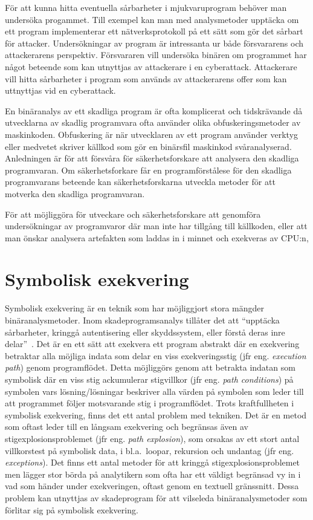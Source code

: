 För att kunna hitta eventuella sårbarheter i mjukvaruprogram behöver man undersöka progammet.
Till exempel kan man med analysmetoder upptäcka om ett program implementerar ett nätverksprotokoll på ett sätt som gör det sårbart för attacker.
Undersökningar av program är intressanta ur både försvararens och attackerarens perspektiv.
Försvararen vill undersöka binären om programmet har något beteende som kan utnyttjas av attackerare i en cyberattack.
Attackerare vill hitta sårbarheter i program som används av attackerarens offer som kan uttnyttjas vid en cyberattack.

En binäranalys av ett skadliga program är ofta komplicerat och tidskrävande då utvecklarna av skadlig programvara ofta använder olika obfuskeringsmetoder av maskinkoden.
Obfuskering är när utvecklaren av ett program använder verktyg eller medvetet skriver källkod som gör en binärsfil maskinkod svåranalyserad.
Anledningen är för att försvåra för säkerhetsforskare att analysera den skadliga programvaran.
Om säkerhetsforkare får en programförstålese för den skadliga programvarans beteende kan säkerhetsforskarna utveckla metoder för att motverka den skadliga programvaran.

För att möjliggöra för utveckare och säkerhetsforskare att genomföra undersökningar av programvaror där man inte har tillgång till källkoden, eller att man önskar analysera artefakten som laddas in i minnet och exekveras av CPU:n,

\section{Symbolisk exekvering}

Symbolisk exekvering är en teknik som har möjliggjort stora mängder binäranalysmetoder\cite{survey_symb_exc, symnav}.
Inom skadeprogramsanalys tillåter det att ``upptäcka sårbarheter, kringgå autentisering eller skyddssystem, eller förstå deras inre delar''~\cite{symnav}.
Det är en ett sätt att exekvera ett program abstrakt där en exekvering betraktar alla möjliga indata som delar en viss exekveringsstig (jfr eng. \emph{execution path}) genom programflödet.
Detta möjliggörs genom att betrakta indatan som symbolisk där en viss stig ackumulerar stigvillkor (jfr eng. \emph{path conditions}) på symbolen vars lösning/lösningar beskriver alla värden på symbolen som leder till att programmet följer motsvarande stig i programflödet.
Trots kraftfullheten i symbolisk exekvering, finns det ett antal problem med tekniken.
Det är en metod som oftast leder till en långsam exekvering och begränsas även av stigexplosionsproblemet (jfr eng. \emph{path explosion}), som orsakas av ett stort antal villkorstest på symbolisk data, i bl.a.\ loopar, rekursion och undantag (jfr eng. \emph{exceptions}).
Det finns ett antal metoder för att kringgå stigexplosionsproblemet men lägger stor börda på analytikern som ofta har ett väldigt begränsad vy in i vad som händer under exekveringen, oftast genom en textuell gränssnitt.
Dessa problem kan utnyttjas av skadeprogram för att vilseleda binäranalysmetoder som förlitar sig på symbolisk exekvering.

